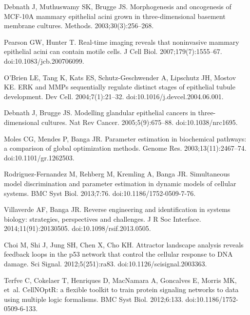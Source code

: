 \documentclass[11pt,letterpaper]{article}
\begin{document}
\begin{thebibliography}{10}
Debnath J, Muthuswamy SK, Brugge JS.
\newblock Morphogenesis and oncogenesis of MCF-10A mammary epithelial acini
  grown in three-dimensional basement membrane cultures.
\newblock Methods. 2003;30(3):256--268.

Pearson GW, Hunter T.
\newblock Real-time imaging reveals that noninvasive mammary epithelial acini
  can contain motile cells.
\newblock J Cell Biol. 2007;179(7):1555--67.
\newblock doi:{10.1083/jcb.200706099}.

O'Brien LE, Tang K, Kats ES, Schutz-Geschwender A, Lipschutz JH, Mostov KE.
\newblock ERK and MMPs sequentially regulate distinct stages of epithelial
  tubule development.
\newblock Dev Cell. 2004;7(1):21--32.
\newblock doi:{10.1016/j.devcel.2004.06.001}.

Debnath J, Brugge JS.
\newblock Modelling glandular epithelial cancers in three-dimensional cultures.
\newblock Nat Rev Cancer. 2005;5(9):675--88.
\newblock doi:{10.1038/nrc1695}.

Moles CG, Mendes P, Banga JR.
\newblock Parameter estimation in biochemical pathways: a comparison of global
  optimization methods.
\newblock Genome Res. 2003;13(11):2467--74.
\newblock doi:{10.1101/gr.1262503}.

Rodriguez-Fernandez M, Rehberg M, Kremling A, Banga JR.
\newblock Simultaneous model discrimination and parameter estimation in dynamic
  models of cellular systems.
\newblock BMC Syst Biol. 2013;7:76.
\newblock doi:{10.1186/1752-0509-7-76}.

Villaverde AF, Banga JR.
\newblock Reverse engineering and identification in systems biology:
  strategies, perspectives and challenges.
\newblock J R Soc Interface. 2014;11(91):20130505.
\newblock doi:{10.1098/rsif.2013.0505}.

Choi M, Shi J, Jung SH, Chen X, Cho KH.
\newblock Attractor landscape analysis reveals feedback loops in the p53
  network that control the cellular response to DNA damage.
\newblock Sci Signal. 2012;5(251):ra83.
\newblock doi:{10.1126/scisignal.2003363}.

Terfve C, Cokelaer T, Henriques D, MacNamara A, Goncalves E, Morris MK, et~al.
\newblock CellNOptR: a flexible toolkit to train protein signaling networks to
  data using multiple logic formalisms.
\newblock BMC Syst Biol. 2012;6:133.
\newblock doi:{10.1186/1752-0509-6-133}.


\end{thebibliography}
\end{document}
